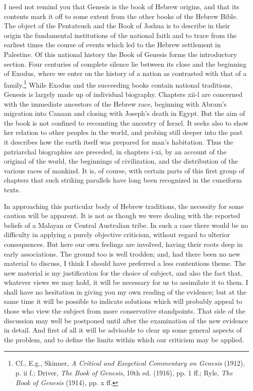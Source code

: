 \documentclass[12pt,oneside]{book}
\begin{document}
I need not remind you that Genesis is the book of Hebrew origins, and that its contents mark it off to some extent from the other books of the Hebrew Bible. The object of the Pentateuch and the Book of Joshua is to describe in their origin the fundamental institutions of the national faith and to trace from the earliest times the course of events which led to the Hebrew settlement in Palestine. Of this national history the Book of Genesis forms the introductory section. Four centuries of complete silence lie between its close and the beginning of Exodus, where we enter on the history of a nation as contrasted with that of a family.\footnote{Cf., E.g., Skinner, \textit{A Critical and Exegetical Commentary on Genesis} (1912), p. ii f.; Driver, \textit{The Book of Genesis}, 10th ed. (1916), pp. 1 ff.; Ryle, \textit{The Book of Genesis} (1914), pp. x ff.} While Exodus and the succeeding books contain national traditions, Genesis is largely made up of individual biography. Chapters xii-l are concerned with the immediate ancestors of the Hebrew race, beginning with Abram's migration into Canaan and closing with Joseph's death in Egypt. But the aim of the book is not confined to recounting the ancestry of Israel. It seeks also to show her relation to other peoples in the world, and probing still deeper into the past it describes how the earth itself was prepared for man's habitation. Thus the patriarchal biographies are preceded, in chapters i-xi, by an account of the original of the world, the beginnings of civilization, and the distribution of the various races of mankind. It is, of course, with certain parts of this first group of chapters that such striking parallels have long been recognized in the cuneiform texts. \par 

In approaching this particular body of Hebrew traditions, the necessity for some caution will be apparent. It is not as though we were dealing with the reported beliefs of a Malayan or Central Australian tribe. In such a case there would be no difficulty in applying a purely objective criticism, without regard to ulterior consequences. But here our own feelings are involved, having their roots deep in early associations. The ground too is well trodden; and, had there been no new material to discuss, I think I should have preferred a less contentious theme. The new material is my justification for the choice of subject, and also the fact that, whatever views we may hold, it will be necessary for us to assimilate it to them. I shall have no hesitation in giving you my own reading of the evidence; but at the same time it will be possible to indicate solutions which will probably appeal to those who view the subject from more conservative standpoints. That side of the discussion may well be postponed until after the examination of the new evidence in detail. And first of all it will be advisable to clear up some general aspects of the problem, and to define the limits within which our criticism may be applied. \par 
\end{document}
